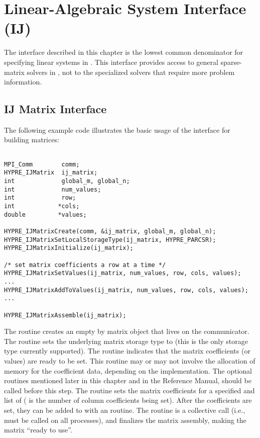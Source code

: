 \chapter{Linear-Algebraic System Interface (IJ)}
\label{Linear-Algebraic System Interface}

The  interface described in this chapter is the lowest common
denominator for specifying linear systems in \hypre{}.  This interface
provides access to general sparse-matrix solvers in \hypre{}, not
to the specialized solvers that require more problem information.


\section{IJ Matrix Interface}

The following example code illustrates the basic usage of the
 interface for building matrices:
\begin{display}
\begin{verbatim}

MPI_Comm        comm;
HYPRE_IJMatrix  ij_matrix;
int             global_m, global_n;
int             num_values;
int             row;
int            *cols;
double         *values;

HYPRE_IJMatrixCreate(comm, &ij_matrix, global_m, global_n);
HYPRE_IJMatrixSetLocalStorageType(ij_matrix, HYPRE_PARCSR);
HYPRE_IJMatrixInitialize(ij_matrix);

/* set matrix coefficients a row at a time */
HYPRE_IJMatrixSetValues(ij_matrix, num_values, row, cols, values);
...
HYPRE_IJMatrixAddToValues(ij_matrix, num_values, row, cols, values);
...

HYPRE_IJMatrixAssemble(ij_matrix);

\end{verbatim}
\end{display}
The  routine creates an empty  by
 matrix object that lives on the  communicator.
The  routine sets the underlying matrix
storage type to  (this is the only storage type
currently supported).  The  routine indicates that
the matrix coefficients (or values) are ready to be set.  This routine
may or may not involve the allocation of memory for the coefficient
data, depending on the implementation.  The optional 
routines mentioned later in this chapter and in the Reference Manual,
should be called before this step.  The  routine
sets the matrix coefficients for a specified  and list of
 ( is the number of column coefficients being set).
After the coefficients are set, they can be added to with an
 routine.
The  routine is a collective call (i.e., must be
called on all processes), and finalizes the matrix assembly, making
the matrix ``ready to use''.

